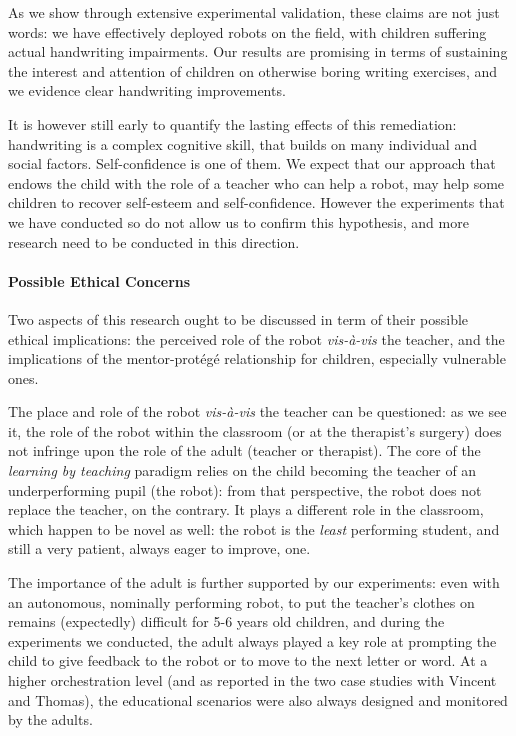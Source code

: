 \documentclass{article}
\begin{document}
As we show through extensive experimental validation, these claims are not just
words: we have effectively deployed robots on the field, with children suffering
actual handwriting impairments. Our results are promising in terms of sustaining
the interest and attention of children on otherwise boring writing exercises,
and we evidence clear handwriting improvements.

It is however still early to quantify the lasting effects of this remediation:
handwriting is a complex cognitive skill, that builds on many individual and
social factors. Self-confidence is one of them. We expect that our
approach that endows the child with the role of a teacher who can help a robot,
may help some children to recover self-esteem and self-confidence. However the
experiments that we have conducted so do not allow us to confirm this
hypothesis, and more research need to be conducted in this direction.


\paragraph{Possible Ethical Concerns} Two aspects of this research ought to be
discussed in term of their possible ethical implications: the perceived role of
the robot \textit{vis-à-vis} the teacher, and the implications of the
mentor-protégé relationship for children, especially vulnerable ones.

The place and role of the robot \textit{vis-à-vis} the teacher can be
questioned: as we see it, the role of the robot within the classroom (or at the
therapist's surgery) does not infringe upon the role of the adult (teacher or
therapist).  The core of the \emph{learning by teaching} paradigm relies on the
child becoming the teacher of an underperforming pupil (the robot): from that
perspective, the robot does not replace the teacher, on the contrary. It plays a
different role in the classroom, which happen to be novel as well: the robot is
the \emph{least} performing student, and still a very patient, always eager to
improve, one.

The importance of the adult is further supported by our experiments: even with
an autonomous, nominally performing robot, to put the teacher's clothes on
remains (expectedly) difficult for 5-6 years old children, and during the
experiments we conducted, the adult always played a key role at prompting the
child to give feedback to the robot or to move to the next letter or word.  At a
higher orchestration level (and as reported in the two case studies with Vincent
and Thomas), the educational scenarios were also always designed and monitored
by the adults.
\end{document}
